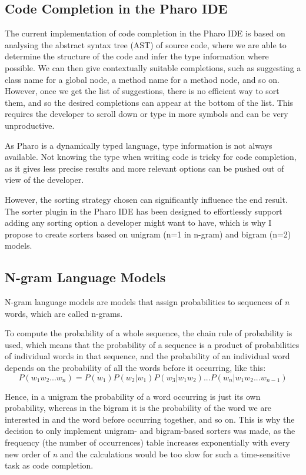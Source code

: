 \documentclass[sigconf,screen]{acmart}
\begin{document}
\subsection{Code Completion in the Pharo IDE}
The current implementation of code completion in the Pharo IDE is based on analysing the abstract syntax tree (AST) of source code, where we are able to determine the structure of the code and infer the type information where possible. We can then give contextually suitable completions, such as suggesting a class name for a global node, a method name for a method node, and so on. However, once we get the list of suggestions, there is no efficient way to sort them, and so the desired completions can appear at the bottom of the list. This requires the developer to scroll down or type in more symbols and can be very unproductive.

As Pharo is a dynamically typed language, type information is not always available. Not knowing the type when writing code is tricky for code completion, as it gives less precise results and more relevant options can be pushed out of view of the developer.

However, the sorting strategy chosen can significantly influence the end result. The sorter plugin in the Pharo IDE has been designed to effortlessly support adding any sorting option a developer might want to have, which is why I propose to create sorters based on unigram (n=1 in n-gram) and bigram (n=2) models.

\subsection{N-gram Language Models}
N-gram language models are models that assign probabilities to sequences of \textit{n} words, which are called n-grams.

To compute the probability of a whole sequence, the chain rule of probability is used, which means that the probability of a sequence is a product of probabilities of individual words in that sequence, and the probability of an individual word depends on the probability of all the words before it occurring, like this:
\begin{equation}
    P(w_1w_2...w_n) = P(w_1)P(w_2|w_1)P(w_3|w_1w_2)...P(w_n|w_1w_2...w_{n-1})
\end{equation}

Hence, in a unigram the probability of a word occurring is just its own probability, whereas in the bigram it is the probability of the word we are interested in and the word before occurring together, and so on. This is why the decision to only implement unigram- and bigram-based sorters was made, as the frequency (the number of occurrences) table increases exponentially with every new order of \textit{n} and the calculations would be too slow for such a time-sensitive task as code completion.
\end{document}
